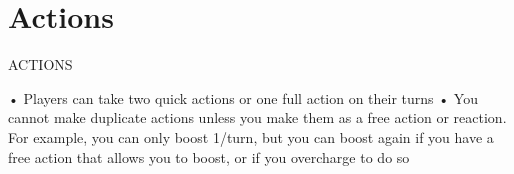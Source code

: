 \section{Actions}
 ACTIONS  

•   Players can take two quick actions or one full action on their turns  
•   You cannot make duplicate actions unless you make them as a free action or reaction. For  
    example, you can only boost 1/turn, but you can boost again if you have a free action that  
    allows you to boost, or if you overcharge to do so  